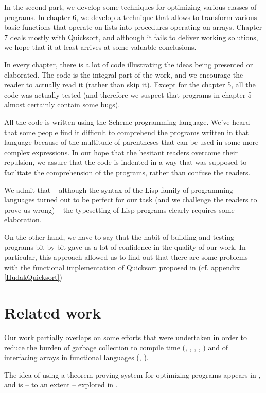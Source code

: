 In the second part, we develop some techniques for optimizing
various classes of programs. In chapter 6, we develop a technique
that allows to transform various basic functions that operate on
lists into procedures operating on arrays. Chapter 7 deals mostly
with Quicksort, and although it fails to deliver working solutions,
we hope that it at least arrives at some valuable conclusions.

In every chapter, there is a lot of code illustrating the ideas
being presented or elaborated. The code is the integral part
of the work, and we encourage the reader to actually read it
(rather than skip it). Except for the chapter 5, all the code was
actually tested (and therefore we suspect that programs in chapter 5
almost certainly contain some bugs).

All the code is written using the Scheme programming language.
We've heard that some people find it difficult to comprehend
the programs written in that language because of the multitude
of parentheses that can be used in some more complex expressions.
In our hope that the hesitant readers overcome their repulsion,
we assure that the code is indented in a way that was supposed
to facilitate the comprehension of the programs, rather than
confuse the readers.

We admit that -- although the syntax of the Lisp family of
programming languages turned out to be perfect for our task
(and we challenge the readers to prove us wrong) --
the typesetting of Lisp programs clearly requires some
elaboration.

On the other hand, we have to say that the habit of building
and testing programs bit by bit gave us a lot of confidence
in the quality of our work. In particular, this approach allowed
us to find out that there are some problems with the functional
implementation of Quicksort proposed in \cite{Hudak1986} (cf.
appendix \ref{HudakQuicksort})

\section{Related work}

Our work partially overlaps on some efforts that were undertaken
in order to reduce the burden of garbage collection to compile
time (\cite{Baker1990}, \cite{Chase1987}, \cite{GopinathHennessy1989},
\cite{Hederman1988}, \cite{Hudak1986}) and of interfacing arrays
in functional languages (\cite{Baker1991}, \cite{Wadler1995}).

The idea of using a theorem-proving system for optimizing programs
appears in \cite{FutamuraKonishiGluck2001}, and is -- to an extent
-- explored in \cite{BurstallDarlington1977}.

